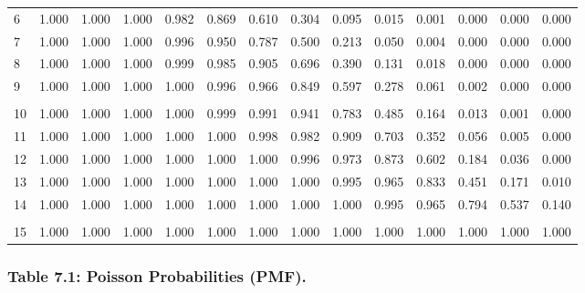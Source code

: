 \documentclass[
]{article}
\begin{document}
\begin{longtable}[t]{lrrrrrrrrrrrrr}
\hspace{1em}6 & 1.000 & 1.000 & 1.000 & 0.982 & 0.869 & 0.610 & 0.304 & 0.095 & 0.015 & 0.001 & 0.000 & 0.000 & 0.000\\
\hspace{1em}7 & 1.000 & 1.000 & 1.000 & 0.996 & 0.950 & 0.787 & 0.500 & 0.213 & 0.050 & 0.004 & 0.000 & 0.000 & 0.000\\
\hspace{1em}8 & 1.000 & 1.000 & 1.000 & 0.999 & 0.985 & 0.905 & 0.696 & 0.390 & 0.131 & 0.018 & 0.000 & 0.000 & 0.000\\
\hspace{1em}9 & 1.000 & 1.000 & 1.000 & 1.000 & 0.996 & 0.966 & 0.849 & 0.597 & 0.278 & 0.061 & 0.002 & 0.000 & 0.000\\
\addlinespace[-.7em]
\multicolumn{14}{l}{ }\\
\hspace{1em}10 & 1.000 & 1.000 & 1.000 & 1.000 & 0.999 & 0.991 & 0.941 & 0.783 & 0.485 & 0.164 & 0.013 & 0.001 & 0.000\\
\hspace{1em}11 & 1.000 & 1.000 & 1.000 & 1.000 & 1.000 & 0.998 & 0.982 & 0.909 & 0.703 & 0.352 & 0.056 & 0.005 & 0.000\\
\hspace{1em}12 & 1.000 & 1.000 & 1.000 & 1.000 & 1.000 & 1.000 & 0.996 & 0.973 & 0.873 & 0.602 & 0.184 & 0.036 & 0.000\\
\hspace{1em}13 & 1.000 & 1.000 & 1.000 & 1.000 & 1.000 & 1.000 & 1.000 & 0.995 & 0.965 & 0.833 & 0.451 & 0.171 & 0.010\\
\hspace{1em}14 & 1.000 & 1.000 & 1.000 & 1.000 & 1.000 & 1.000 & 1.000 & 1.000 & 0.995 & 0.965 & 0.794 & 0.537 & 0.140\\
\addlinespace[-.7em]
\multicolumn{14}{l}{ }\\
\hspace{1em}15 & 1.000 & 1.000 & 1.000 & 1.000 & 1.000 & 1.000 & 1.000 & 1.000 & 1.000 & 1.000 & 1.000 & 1.000 & 1.000\\
\bottomrule
\end{longtable}

\newpage

\subsubsection{Table 7.1: Poisson Probabilities
(PMF).}\label{table-7.1-poisson-probabilities-pmf.}
\end{document}
